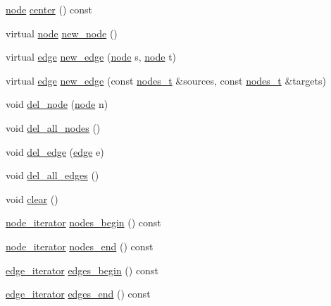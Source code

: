 \begin{DoxyCompactItemize}
\item 
\mbox{\hyperlink{classnode}{node}} \mbox{\hyperlink{classgraph_a351617e023b4b6833ab650a70fc086e7}{center}} () const
\item 
virtual \mbox{\hyperlink{classnode}{node}} \mbox{\hyperlink{classgraph_ab9505335c20558319b6cce25aed23524}{new\+\_\+node}} ()
\item 
virtual \mbox{\hyperlink{classedge}{edge}} \mbox{\hyperlink{classgraph_a02a0c3a219f75d68caa408ef339d4a1c}{new\+\_\+edge}} (\mbox{\hyperlink{classnode}{node}} s, \mbox{\hyperlink{classnode}{node}} t)
\item 
virtual \mbox{\hyperlink{classedge}{edge}} \mbox{\hyperlink{classgraph_a2ae550efa58c48056d5df22ed26c5c6c}{new\+\_\+edge}} (const \mbox{\hyperlink{edge_8h_a22ac17689106ba21a84e7bc54d1199d6}{nodes\+\_\+t}} \&sources, const \mbox{\hyperlink{edge_8h_a22ac17689106ba21a84e7bc54d1199d6}{nodes\+\_\+t}} \&targets)
\item 
void \mbox{\hyperlink{classgraph_a8bdc09d5b9ac4bd26586b054d8fcbe91}{del\+\_\+node}} (\mbox{\hyperlink{classnode}{node}} n)
\item 
void \mbox{\hyperlink{classgraph_ad0ca1578643a51f96a76a846f14558df}{del\+\_\+all\+\_\+nodes}} ()
\item 
void \mbox{\hyperlink{classgraph_ad9356508c49c542dfd4b7169297387c6}{del\+\_\+edge}} (\mbox{\hyperlink{classedge}{edge}} e)
\item 
void \mbox{\hyperlink{classgraph_aae52be443c5aef001b5f6758855f15ad}{del\+\_\+all\+\_\+edges}} ()
\item 
void \mbox{\hyperlink{classgraph_a9ff5d6af3653e79f87b836701453f55a}{clear}} ()
\item 
\mbox{\hyperlink{classgraph_a2cb374b84c133ce13f94e73c3e5da7fa}{node\+\_\+iterator}} \mbox{\hyperlink{classgraph_aec053a4b509d1be804237a80044c54c0}{nodes\+\_\+begin}} () const
\item 
\mbox{\hyperlink{classgraph_a2cb374b84c133ce13f94e73c3e5da7fa}{node\+\_\+iterator}} \mbox{\hyperlink{classgraph_abbf9c0cb5629e98e1142254911238173}{nodes\+\_\+end}} () const
\item 
\mbox{\hyperlink{classgraph_a818d3766018eb0af91d520ce2150203c}{edge\+\_\+iterator}} \mbox{\hyperlink{classgraph_a7ba35a4c4e8343ffb27ed6d9703c6f18}{edges\+\_\+begin}} () const
\item 
\mbox{\hyperlink{classgraph_a818d3766018eb0af91d520ce2150203c}{edge\+\_\+iterator}} \mbox{\hyperlink{classgraph_aea8d7f976b85b6137f52d915e26639f6}{edges\+\_\+end}} () const
\item 

\end{DoxyCompactItemize}
